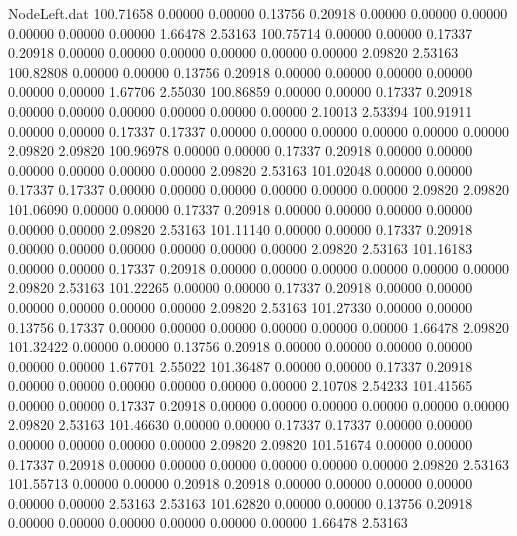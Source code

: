 \begin{filecontents}{NodeLeft.dat}
 100.71658    0.00000    0.00000     0.13756    0.20918    0.00000    0.00000    0.00000    0.00000    0.00000    0.00000    1.66478    2.53163
 100.75714    0.00000    0.00000     0.17337    0.20918    0.00000    0.00000    0.00000    0.00000    0.00000    0.00000    2.09820    2.53163
 100.82808    0.00000    0.00000     0.13756    0.20918    0.00000    0.00000    0.00000    0.00000    0.00000    0.00000    1.67706    2.55030
 100.86859    0.00000    0.00000     0.17337    0.20918    0.00000    0.00000    0.00000    0.00000    0.00000    0.00000    2.10013    2.53394
 100.91911    0.00000    0.00000     0.17337    0.17337    0.00000    0.00000    0.00000    0.00000    0.00000    0.00000    2.09820    2.09820
 100.96978    0.00000    0.00000     0.17337    0.20918    0.00000    0.00000    0.00000    0.00000    0.00000    0.00000    2.09820    2.53163
 101.02048    0.00000    0.00000     0.17337    0.17337    0.00000    0.00000    0.00000    0.00000    0.00000    0.00000    2.09820    2.09820
 101.06090    0.00000    0.00000     0.17337    0.20918    0.00000    0.00000    0.00000    0.00000    0.00000    0.00000    2.09820    2.53163
 101.11140    0.00000    0.00000     0.17337    0.20918    0.00000    0.00000    0.00000    0.00000    0.00000    0.00000    2.09820    2.53163
 101.16183    0.00000    0.00000     0.17337    0.20918    0.00000    0.00000    0.00000    0.00000    0.00000    0.00000    2.09820    2.53163
 101.22265    0.00000    0.00000     0.17337    0.20918    0.00000    0.00000    0.00000    0.00000    0.00000    0.00000    2.09820    2.53163
 101.27330    0.00000    0.00000     0.13756    0.17337    0.00000    0.00000    0.00000    0.00000    0.00000    0.00000    1.66478    2.09820
 101.32422    0.00000    0.00000     0.13756    0.20918    0.00000    0.00000    0.00000    0.00000    0.00000    0.00000    1.67701    2.55022
 101.36487    0.00000    0.00000     0.17337    0.20918    0.00000    0.00000    0.00000    0.00000    0.00000    0.00000    2.10708    2.54233
 101.41565    0.00000    0.00000     0.17337    0.20918    0.00000    0.00000    0.00000    0.00000    0.00000    0.00000    2.09820    2.53163
 101.46630    0.00000    0.00000     0.17337    0.17337    0.00000    0.00000    0.00000    0.00000    0.00000    0.00000    2.09820    2.09820
 101.51674    0.00000    0.00000     0.17337    0.20918    0.00000    0.00000    0.00000    0.00000    0.00000    0.00000    2.09820    2.53163
 101.55713    0.00000    0.00000     0.20918    0.20918    0.00000    0.00000    0.00000    0.00000    0.00000    0.00000    2.53163    2.53163
 101.62820    0.00000    0.00000     0.13756    0.20918    0.00000    0.00000    0.00000    0.00000    0.00000    0.00000    1.66478    2.53163

\end{filecontents}
